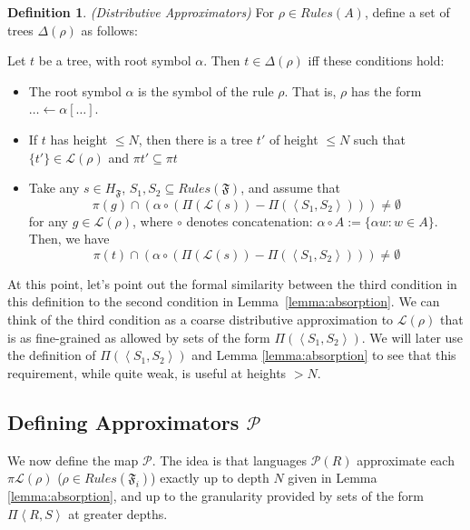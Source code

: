 \documentclass[sigplan,9pt]{acmart}\settopmatter{printfolios=true,printccs=false,printacmref=false}
\newcounter{thm}
\newcounter{theorem}
\theoremstyle{definition}
\newtheorem{defin}[thm]{Definition}
\newcommand{\La}[0]{{\mathcal{L}}}
\newcommand{\Ff}[0]{{\mathfrak{F}}}
\newcommand{\Pa}[0]{{\mathcal{P}}}
\begin{document}
\begin{defin}\label{defin:approximators}
\emph{(Distributive Approximators)} For $\rho \in Rules(A)$, define a set of trees $\Delta(\rho)$ as follows:

Let $t$ be a tree, with root symbol $\alpha$. Then $t \in \Delta(\rho)$ iff these conditions hold:


\begin{itemize}
\item The root symbol $\alpha$ is the symbol of the rule $\rho$. That is, $\rho$ has the form $\dots \leftarrow \alpha[\dots]$.%

\item If $t$ has height $\leq N$, then there is a tree $t'$ of height $\leq N$ such that $\{t'\} \in \La(\rho)$ and $\pi t' \subseteq \pi t$

\item Take any $s \in H_\Ff$, $S_1, S_2 \subseteq Rules(\Ff)$, and assume that $$\pi(g) \cap \left(\alpha \circ \left(\Pi(\La(s)) -\Pi(\left\langle S_1, S_2\right\rangle)\right)\right)  \neq \emptyset$$ for any $g \in \La(\rho)$, where $\circ$ denotes concatenation: $\alpha \circ A := \{\alpha w : w \in A\}$.
Then, we have $$\pi(t) \cap \left(\alpha \circ \left(\Pi(\La(s)) -\Pi(\left\langle S_1, S_2\right\rangle)\right)\right)  \neq \emptyset$$

\end{itemize}
\end{defin}

At this point, let's point out the formal similarity between the third condition in this definition to the second condition in Lemma~\ref{lemma:absorption}.
We can think of the third condition as a coarse distributive approximation to $\La(\rho)$ that is as fine-grained as allowed by sets of the form $\Pi(\left\langle S_1, S_2\right\rangle)$. We will later use the definition of $\Pi(\left\langle S_1, S_2\right\rangle) $ and Lemma \ref{lemma:absorption} to see that this requirement, while quite weak, is useful at heights $> N$.

\subsection{Defining Approximators $\Pa$}



We now define the map $\Pa$. The idea is that languages $\Pa(R)$ approximate each $\pi\La(\rho)$ ($\rho \in Rules(\Ff_i)$) exactly up to depth $N$ given in Lemma \ref{lemma:absorption}, and up to the granularity provided by sets of the form $\Pi\left\langle R,S\right\rangle$ at greater depths.
\end{document}

